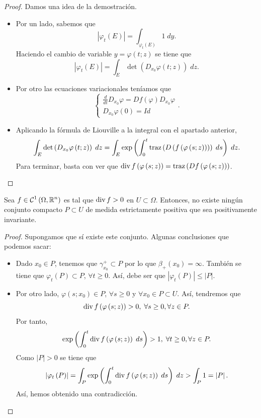 \begin{proof}
Damos una idea de la demostración. 
\begin{itemize}
\item Por un lado, sabemos que 
	\[ \left|\varphi_{t}\left(E\right)\right|=\int _{\varphi_{t}\left(E\right)}1 \; dy .\]
	Haciendo el cambio de variable $\displaystyle y = \varphi\left(t; z\right) $ se tiene que 
	\[ \left|\varphi_{t}\left(E\right)\right|=\int _{E}\det\left(D_{x_{0}}\varphi\left(t; z\right)\right) \; dz .\]
\item Por otro las ecuaciones variacionales teníamos que 
	\[
	\begin{cases}
	\frac{d}{dt}D_{x_{0}}\varphi = Df\left(\varphi\right)D_{x_{0}}\varphi \\
	D_{x_{0}}\varphi\left(0\right)=Id
	\end{cases}
	.\]
\item Aplicando la fórmula de Liouville a la integral con el apartado anterior,
	\[\int _{E}\det\left(D_{x_{0}}\varphi\left(t; z\right)\right) \; dz = \int _{E}\exp\left(\int^{t}_{0} \operatorname{traz}\left(D\left(f\left(\varphi\left(s;z\right)\right)\right)\right) \; d s\right) \; dz .\]
	Para terminar, basta con ver que $\displaystyle \operatorname{div} f\left(\varphi\left(s; z\right)\right)=\operatorname{traz}\left(Df\left(\varphi\left(s; z\right)\right)\right) $. 
\end{itemize}
\end{proof}
\begin{colorary}
Sea $\displaystyle f\in \mathcal{C}^{1}\left(\Omega , \mathbb{R}^{n}\right) $ es tal que $\displaystyle \operatorname{div} f > 0 $ en $\displaystyle U\subset \Omega  $. Entonces, no existe ningún conjunto compacto $\displaystyle P \subset U $ de medida estrictamente positiva que sea positivamente invariante. 
\end{colorary}
\begin{proof}
Supongamos que sí existe este conjunto. Algunas conclusiones que podemos sacar:
\begin{itemize}
\item Dado $\displaystyle x_{0}\in P $, tenemos que $\displaystyle \gamma_{x_{0}}^{+ }\subset P $ por lo que $\displaystyle \beta_{+}\left(x_{0}\right)=\infty  $. También se tiene que $\displaystyle \varphi_{t}\left(P\right)\subset P $, $\displaystyle \forall t \geq 0 $. Así, debe ser que $\displaystyle \left|\varphi_{t}\left(P\right)\right|\leq \left|P\right| $. 
\item Por otro lado, $\displaystyle \varphi\left(s; x_{0}\right)\in P $, $\displaystyle \forall s \geq 0 $ y $\displaystyle \forall x_{0}\in P \subset U $. Así, tendremos que
	\[\operatorname{div} f\left(\varphi\left(s; z\right)\right)>0, \; \forall s \geq 0, \forall z \in P .\]
	Por tanto, 
	\[\exp\left(\int^{t}_{0} \operatorname{div} f\left(\varphi\left(s; z\right)\right) \; d s\right) > 1, \; \forall t \geq 0, \forall z \in P .\]
Como $\displaystyle \left|P\right|> 0 $ se tiene que 
\[ \left|\varphi_{t}\left(P\right)\right| = \int _{P}\exp\left(\int^{t}_{0} \operatorname{div} f\left(\varphi\left(s; z\right)\right) \; d s\right) \; dz > \int _{P}1 = \left|P\right|.\]
Así, hemos obtenido una contradicción. 
\end{itemize}
\end{proof}

